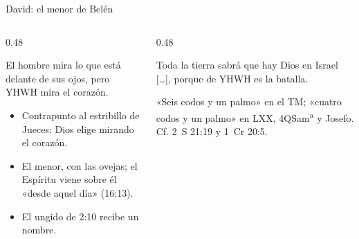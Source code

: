 \begin{frame}{David: el menor de Belén}
\begin{columns}[T,onlytextwidth]
\begin{column}{0.48\textwidth}
\par\smallskip
\begin{cita}El hombre mira lo que está delante de sus ojos, pero YHWH mira el corazón.\end{cita}
\footnotesize
\begin{itemize}
\item Contrapunto al estribillo de Jueces: Dios elige mirando el corazón.
\item El menor, con las ovejas; el Espíritu viene sobre él «desde aquel día» (16:13).
\item El ungido de 2:10 recibe un nombre.
\end{itemize}
\end{column}
\begin{column}{0.48\textwidth}
\par\smallskip
\begin{cita}Toda la tierra sabrá que hay Dios en Israel [\ldots], porque de YHWH es la batalla.\end{cita}
\begin{notalam}
«Seis codos y un palmo» en el TM; «cuatro codos y un palmo» en LXX, 4QSam\textsuperscript{a} y Josefo. Cf. 2~S 21:19 y 1~Cr 20:5.
\end{notalam}
\end{column}
\end{columns}
\end{frame}

